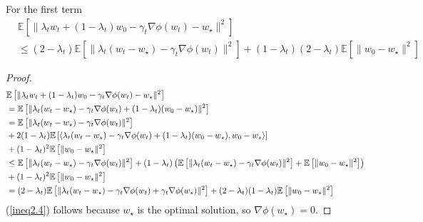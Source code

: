 \begin{lemma}
	For the first term
	\begin{equation}
		\begin{split}
			&\mathbb{E}\left[\|\lambda_t w_t +(1-\lambda_t)w_0 -\gamma_t \nabla\phi(w_t)-w_\star\|^2 \right]\\
			&\leq
			(2-\lambda_t)\mathbb{E}\left[ \|\lambda_t (w_t-w_\star)-\gamma_t \nabla\phi(w_t)\|^2\right]
			+(1-\lambda_t)(2-\lambda_t)\mathbb{E}\left[ \|w_0-w_\star\|^2\right]
		\end{split}
	\end{equation}
\end{lemma}
\begin{proof}
	\begin{align}
		&\mathbb{E}\left[\|\lambda_t w_t +(1-\lambda_t)w_0 -\gamma_t \nabla\phi(w_t)-w_\star\|^2 \right]\\
		&=\mathbb{E}\left[ \|\lambda_t (w_t-w_\star)-\gamma_t \nabla\phi(w_t)+(1-\lambda_t)(w_0-w_\star)\|^2\right]\\
		\notag
		&=\mathbb{E}\left[ \|\lambda_t (w_t-w_\star)-\gamma_t \nabla\phi(w_t)\|^2\right]\\
		\notag
		&+2(1-\lambda_t)\mathbb{E}\left[ \left<\lambda_t (w_t-w_\star)-\gamma_t \nabla\phi(w_t)+(1-\lambda_t)(w_0-w_\star), w_0-w_\star\right>\right]\\
		&+(1-\lambda_t)^2\mathbb{E}\left[ \|w_0-w_\star\|^2\right]\\
		\notag
		&\leq \mathbb{E}\left[ \|\lambda_t (w_t-w_\star)-\gamma_t \nabla\phi(w_t)\|^2\right]
		+(1-\lambda_t)\left( \mathbb{E}\left[ \|\lambda_t (w_t-w_\star)-\gamma_t \nabla\phi(w_t)\|^2\right]+\mathbb{E}\left[ \|w_0-w_\star\|^2\right] \right)\\
		&+(1-\lambda_t)^2\mathbb{E}\left[ \|w_0-w_\star\|^2\right]\\
		\label{ineq2.4}
		&=(2-\lambda_t)\mathbb{E}\left[ \|\lambda_t (w_t-w_\star)-\gamma_t \nabla\phi(w_t)+\gamma_t\nabla\phi(w_\star)\|^2\right]
		+(2-\lambda_t)(1-\lambda_t)\mathbb{E}\left[ \|w_0-w_\star\|^2\right]
	\end{align}
	(\ref{ineq2.4}) follows because $w_\star$ is the optimal solution, so $\nabla\phi(w_\star)=0$.
\end{proof}

